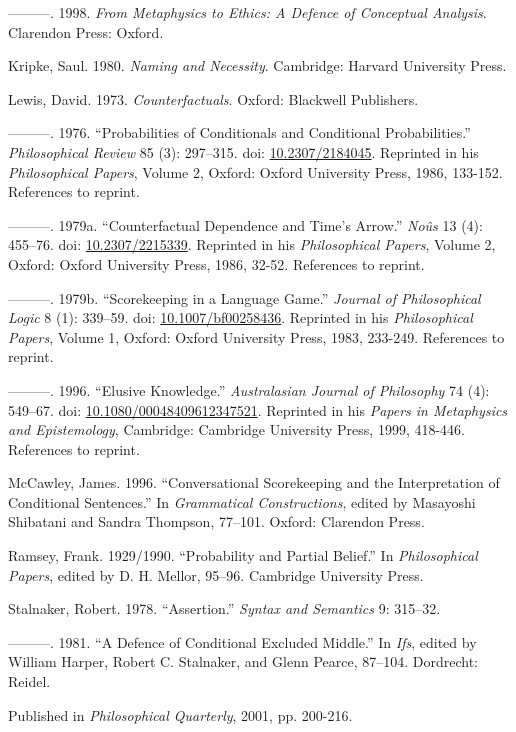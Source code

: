 \documentclass[
  11pt,
  letterpaper,
  DIV=11,
  numbers=noendperiod,
  twoside]{scrartcl}
\newlength{\cslhangindent}
\newenvironment{CSLReferences}[2] %
 {\begin{list}{}{%
  \setlength{\itemindent}{0pt}
  \setlength{\leftmargin}{0pt}
  \setlength{\parsep}{0pt}
  \ifodd #1
   \setlength{\leftmargin}{\cslhangindent}
   \setlength{\itemindent}{-1\cslhangindent}
  \fi
  \setlength{\itemsep}{#2\baselineskip}}}
 {\end{list}}
\begin{document}
\begin{CSLReferences}{1}{0}
---------. 1998. \emph{From Metaphysics to Ethics: A Defence of
Conceptual Analysis}. Clarendon Press: Oxford.

Kripke, Saul. 1980. \emph{Naming and Necessity}. Cambridge: Harvard
University Press.

Lewis, David. 1973. \emph{Counterfactuals}. Oxford: Blackwell
Publishers.

---------. 1976. {``Probabilities of Conditionals and Conditional
Probabilities.''} \emph{Philosophical Review} 85 (3): 297--315. doi:
\href{https://doi.org/10.2307/2184045}{10.2307/2184045}. Reprinted in
his \emph{Philosophical Papers}, Volume 2, Oxford: Oxford University
Press, 1986, 133-152. References to reprint.

---------. 1979a. {``Counterfactual Dependence and Time's Arrow.''}
\emph{No{û}s} 13 (4): 455--76. doi:
\href{https://doi.org/10.2307/2215339}{10.2307/2215339}. Reprinted in
his \emph{Philosophical Papers}, Volume 2, Oxford: Oxford University
Press, 1986, 32-52. References to reprint.

---------. 1979b. {``Scorekeeping in a Language Game.''} \emph{Journal
of Philosophical Logic} 8 (1): 339--59. doi:
\href{https://doi.org/10.1007/bf00258436}{10.1007/bf00258436}. Reprinted
in his \emph{Philosophical Papers}, Volume 1, Oxford: Oxford University
Press, 1983, 233-249. References to reprint.

---------. 1996. {``Elusive Knowledge.''} \emph{Australasian Journal of
Philosophy} 74 (4): 549--67. doi:
\href{https://doi.org/10.1080/00048409612347521}{10.1080/00048409612347521}.
Reprinted in his \emph{Papers in Metaphysics and Epistemology},
Cambridge: Cambridge University Press, 1999, 418-446. References to
reprint.

McCawley, James. 1996. {``Conversational Scorekeeping and the
Interpretation of Conditional Sentences.''} In \emph{Grammatical
Constructions}, edited by Masayoshi Shibatani and Sandra Thompson,
77--101. Oxford: Clarendon Press.

Ramsey, Frank. 1929/1990. {``Probability and Partial Belief.''} In
\emph{Philosophical Papers}, edited by D. H. Mellor, 95--96. Cambridge
University Press.

Stalnaker, Robert. 1978. {``Assertion.''} \emph{Syntax and Semantics} 9:
315--32.

---------. 1981. {``A Defence of Conditional Excluded Middle.''} In
\emph{Ifs}, edited by William Harper, Robert C. Stalnaker, and Glenn
Pearce, 87--104. Dordrecht: Reidel.

\end{CSLReferences}



\noindent Published in\emph{
Philosophical Quarterly}, 2001, pp. 200-216.
\end{document}
